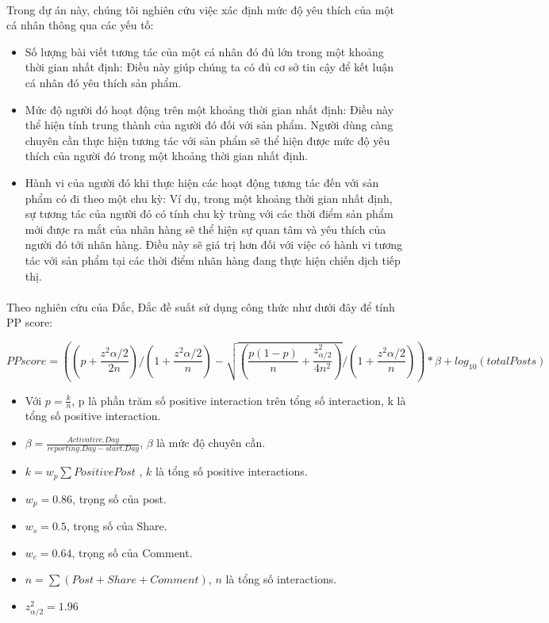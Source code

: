 \documentclass[12pt]{article}
\numberwithin{equation}{section}
\begin{document}
\paragraph{} Trong dự án này, chúng tôi nghiên cứu việc xác định mức độ yêu thích của một cá nhân thông qua các yếu tố:

\begin{itemize} 

\item Số lượng bài viết tương tác của một cá nhân đó đủ lớn trong một khoảng thời gian nhất định: Điều này giúp chúng ta có đủ cơ sở tin cậy để kết luận cá nhân đó yêu thích sản phẩm.


\item Mức độ người đó hoạt động trên một khoảng thời gian nhất định: Điều này thể hiện tính trung thành của người đó đối với sản phẩm. Người dùng càng chuyên cần thực hiện tương tác với sản phẩm sẽ thể hiện được mức độ yêu thích của người đó trong một khoảng thời gian nhất định.

\item Hành vi của người đó khi thực hiện các hoạt động tương tác đến với sản phẩm có đi theo một chu kỳ: Ví dụ, trong một khoảng thời gian nhất định, sự tương tác của người đó có tính chu kỳ trùng với các thời điểm sản phẩm mới được ra mắt của nhãn hàng sẽ thể hiện sự quan tâm và yêu thích của người đó tới nhãn hàng. Điều này sẽ giá trị hơn đối với việc có hành vi tương tác với sản phẩm tại các thời điểm nhãn hàng đang thực hiện chiến dịch tiếp thị.

\end{itemize}

\paragraph{} Theo nghiên cứu của Đắc, Đắc đề suất sử dụng công thức như dưới đây để tính PP score:

\begin{equation}
PP score = ((p + \frac{z^2{\alpha/2}}{2n}) / (1 + \frac{z^2{\alpha/2}}{n}) - \sqrt{(\frac{p(1-p)}{n} + \frac{z^2_{\alpha/2}}{4n^2})} / (1 + \frac{z^2{\alpha/2}}{n})) * \beta + log_{10}(totalPosts)
\end{equation}

\begin{itemize}
\item Với $p=\frac{k}{n}$, p là phần trăm số positive interaction trên tổng số interaction, k là tổng số positive interaction.
\item $\beta = \frac{Activative.Day}{reporting.Day - start.Day}$, $\beta$ là mức độ chuyên cần.
\item $k = w_p\sum{Positive Post}$ , $k$ là tổng số positive interactions.
\item $w_p = 0.86$, trọng số của post.
\item $w_s = 0.5$, trọng số của Share.
\item $w_c = 0.64$, trọng số của Comment.
\item $n = \sum{(Post + Share + Comment)}$, $n$ là tổng số interactions.
\item $z^2_{\alpha/2} = 1.96$
\end{itemize}
\end{document}
